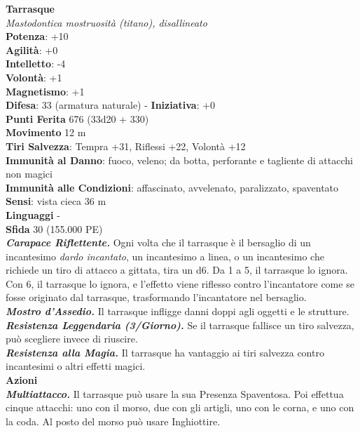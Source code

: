 \begin{multicols}{2}
\medskip\textbf{Tarrasque}\\
\emph{Mastodontica mostruosità (titano), disallineato}\\
\textbf{Potenza}: +10\\
\textbf{Agilità}: +0\\
\textbf{Intelletto}: -4\\
\textbf{Volontà}: +1\\
\textbf{Magnetismo}: +1\\
\textbf{Difesa}: 33 (armatura naturale) - \textbf{Iniziativa}: +0\\
\textbf{Punti Ferita} 676 (33d20 + 330)\\
\textbf{Movimento} 12 m\\
\textbf{Tiri Salvezza}: Tempra +31, Riflessi +22, Volontà +12\\
\textbf{Immunità al Danno}: fuoco, veleno; da botta, perforante e tagliente di attacchi non magici\\
\textbf{Immunità alle Condizioni}: affascinato, avvelenato, paralizzato, spaventato\\
\textbf{Sensi}: vista cieca 36 m \\
\textbf{Linguaggi} -\\
\textbf{Sfida} 30 (155.000 PE)\smallskip\\
\emph{\textbf{Carapace Riflettente.}} Ogni volta che il tarrasque è il bersaglio di un incantesimo \emph{dardo incantato}, un incantesimo a linea, o un incantesimo che richiede un tiro di attacco a gittata, tira un d6. Da 1 a 5, il tarrasque lo ignora. Con 6, il tarrasque lo ignora, e l'effetto viene riflesso contro l'incantatore come se fosse originato dal tarrasque, trasformando l'incantatore nel bersaglio. \\
\emph{\textbf{Mostro d'Assedio.}} Il tarrasque infligge danni doppi agli oggetti e le strutture.\\
\emph{\textbf{Resistenza Leggendaria (3/Giorno).}} Se il tarrasque fallisce un tiro salvezza, può scegliere invece di riuscire.\\
\emph{\textbf{Resistenza alla Magia.}} Il tarrasque ha vantaggio ai tiri salvezza contro incantesimi o altri effetti magici.\\
\smallskip\textbf{Azioni}\\
\emph{\textbf{Multiattacco.}} Il tarrasque può usare la sua Presenza Spaventosa. Poi effettua cinque attacchi: uno con il morso, due con gli artigli, uno con le corna, e uno con la coda. Al posto del morso può usare Inghiottire.\\

\end{multicols}
